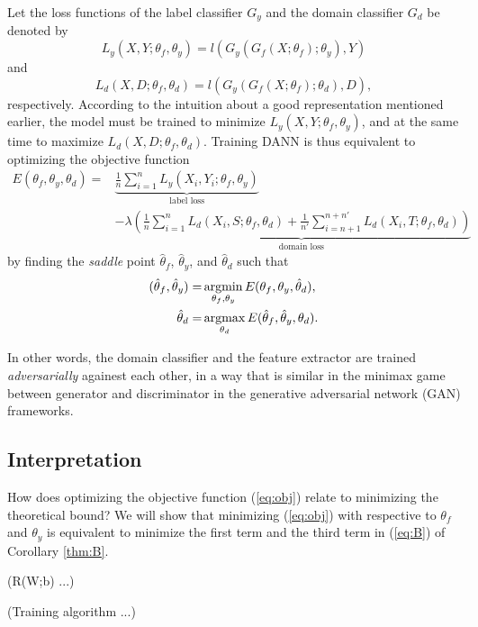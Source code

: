 Let the loss functions of the label classifier $G_y$ and the domain classifier $G_d$ be denoted by
\begin{equation}\label{eq:loss_y}
  L_y(X, Y; \theta_f, \theta_y) = l(G_y(G_f(X; \theta_f); \theta_y), Y)
\end{equation}
and
\begin{equation}\label{eq:loss_d}
  L_d(X, D; \theta_f, \theta_d) = l(G_y(G_f(X; \theta_f); \theta_d), D),
\end{equation}
respectively. According to the intuition about a good representation mentioned earlier, the model must be trained to minimize $L_y(X, Y; \theta_f, \theta_y)$, and at the same time to maximize $L_d(X, D; \theta_f, \theta_d)$. Training DANN is thus equivalent to optimizing the objective function
\begin{equation}\label{eq:obj}
  \begin{aligned}
    E(\theta_f, \theta_y, \theta_d)
    =& \underbrace{\frac{1}{n} \sum_{i=1}^{n}  L_y(X_i, Y_i; \theta_f, \theta_y)}
       _{\text{label loss}} \\
     & - \lambda \underbrace{(
       \frac{1}{n} \sum_{i=1}^{n} L_d(X_i, S; \theta_f, \theta_d)
       + \frac{1}{n'} \sum_{i=n+1}^{n + n'} L_d(X_i, T; \theta_f, \theta_{d}))}
       _{\text{domain loss}}
  \end{aligned}
\end{equation}
by finding the \textit{saddle} point $\hat{\theta}_f$, $\hat{\theta}_y$, and $\hat{\theta}_d$ such that
\begin{align}
  (\hat{\theta}_f, \hat{\theta}_y) = & \mathop{\mathrm{argmin}}_{\theta_f, \theta_y} E(\theta_f, \theta_y, \hat{\theta}_d), \label{eq:opt_argmin}\\
  \hat{\theta}_d = & \mathop{\mathrm{argmax}}_{\theta_d} E(\hat{\theta}_f, \hat{\theta}_y, \theta_d). \label{eq:opt_argmax}
\end{align}

In other words, the domain classifier and the feature extractor are trained \textit{adversarially} againest each other, in a way that is similar in the minimax game between generator and discriminator in the generative adversarial network (GAN) frameworks.


\subsection{Interpretation}
How does optimizing the objective function (\ref{eq:obj}) relate to minimizing the theoretical bound? We will show that minimizing (\ref{eq:obj}) with respective to $\theta_f$ and $\theta_y$ is equivalent to minimize the first term and the third term in (\ref{eq:B}) of Corollary \ref{thm:B}.

(R(W;b) ...)

(Training algorithm ...)

